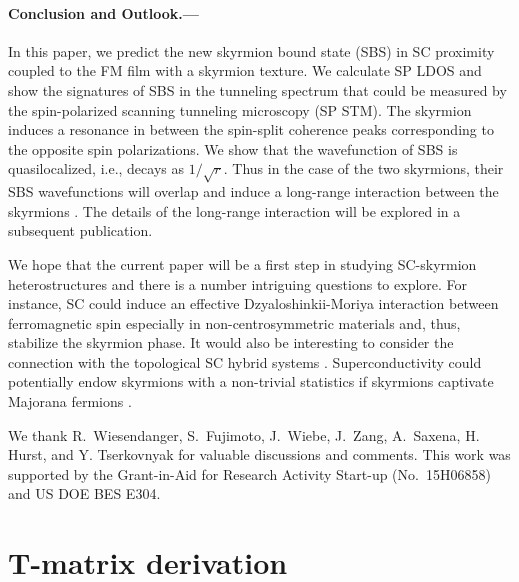 \documentclass[twocolumn,showpacs,floatfix,longbibliography]{revtex4-1}
\begin{document}
\paragraph*{Conclusion and Outlook.---} \label{sec:conclusion}

In this paper, we predict the new skyrmion bound state (SBS) in SC proximity coupled to the FM film with a skyrmion texture. We calculate SP LDOS and show the signatures of SBS in the tunneling spectrum that could be measured by the spin-polarized scanning tunneling microscopy (SP STM). The skyrmion induces a resonance in between the spin-split coherence peaks corresponding to the opposite spin polarizations. We show that the wavefunction of SBS is quasilocalized, i.e., decays as $1/\sqrt{r}$. Thus in the case of the two skyrmions, their SBS wavefunctions will overlap and induce a long-range interaction between the skyrmions \cite{Yao2014,Menard2015}. The details of the long-range interaction will be explored in a subsequent publication.

We hope that the current paper will be a first step in studying SC-skyrmion heterostructures and there is a number intriguing questions to explore. For instance, SC could induce an effective Dzyaloshinkii-Moriya interaction between ferromagnetic spin especially in non-centrosymmetric materials and, thus, stabilize the skyrmion phase. It would also be interesting to consider the connection with the topological SC hybrid systems \cite{Alicea2012,Nakosai2013}. Superconductivity could potentially endow skyrmions with a non-trivial statistics if skyrmions captivate Majorana fermions \cite{Kim2015}.

We thank  R.~Wiesendanger, S.~Fujimoto, J.~Wiebe, J.~Zang, A.~Saxena, H. Hurst, and Y. Tserkovnyak for valuable discussions and comments. This work was supported by the Grant-in-Aid for Research Activity Start-up (No.~15H06858) and US DOE BES E304.

\newpage




\appendix

\section{T-matrix derivation} \label{sec:appendixTMatrix}
\end{document}
